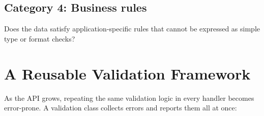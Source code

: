 \subsection*{Category 4: Business rules}\label{31-input-handling:category-4-business-rules}

Does the data satisfy application-specific rules that cannot be expressed as simple type or format checks?

\begin{codebox}[short]

\begin{Shaded}
\begin{Highlighting}[]

\OperatorTok{{-}\textgreater{}} \NormalTok{:}
\OperatorTok{=}
\OperatorTok{=}\NormalTok{ cursor.fetchone()[}\NormalTok{]}
    \OperatorTok{\textgreater{}} 
\end{Highlighting}
\end{Shaded}

\end{codebox}

\setcounter{section}{2}
\section{A Reusable Validation Framework}\label{31-input-handling:313-a-reusable-validation-framework}

As the API grows, repeating the same validation logic in every handler becomes error-prone. A validation class collects errors and reports them all at once:


